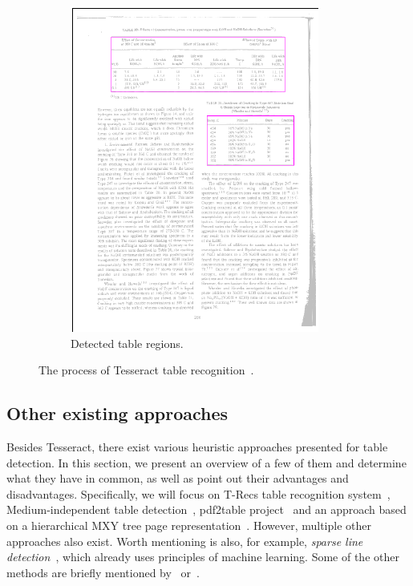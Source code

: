 \begin{figure}
\begin{subfigure}{0.30\textwidth}
\includegraphics[width=\linewidth]{img/tableDetection/tableDetectionResult.pdf}
\caption{Detected table regions.}
\label{fig:tessTableDet5}
\end{subfigure}
\caption{The process of Tesseract table recognition~\cite{tableDetHeterogeneous}.}
\label{fig:tesseractTableRecognition}
\end{figure}

\subsection{Other existing approaches}

Besides Tesseract, there exist various heuristic approaches presented for table detection. In this section, we present an overview of a few of them and determine what they have in common, as well as point out their advantages and disadvantages. Specifically, we will focus on T-Recs table recognition system~\citep{TRecs}, Medium-independent table detection~\citep{MediumTable}, pdf2table project~\cite{pdf2table} and an approach based on a hierarchical MXY tree page representation~\citep{tableDetectCesarini}. However, multiple other approaches also exist. Worth mentioning is also, for example, \emph{sparse line detection}~\cite{sparseLineDetection}, which already uses principles of machine learning. Some of the other methods are briefly mentioned by~\citet{otherDetection1} or~\citet{otherDetection2}.


